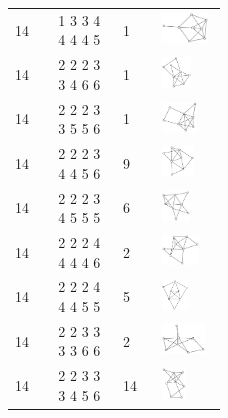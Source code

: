 \begin{footnotesize}
\begin{longtable}{m{0.07\linewidth} m{0.15\linewidth} m{0.05\linewidth} m{0.15\linewidth}}
14 & 1 3 3 4 4 4 4 5 & 1 & \includegraphics[height=0.8cm]{15-universal-graphs/img/degree-sequences-example-graphs/graph-4-8-79}\\
14 & 2 2 2 3 3 4 6 6 & 1 & \includegraphics[height=0.8cm]{15-universal-graphs/img/degree-sequences-example-graphs/graph-4-8-80}\\
14 & 2 2 2 3 3 5 5 6 & 1 & \includegraphics[height=0.8cm]{15-universal-graphs/img/degree-sequences-example-graphs/graph-4-8-81}\\
14 & 2 2 2 3 4 4 5 6 & 9 & \includegraphics[height=0.8cm]{15-universal-graphs/img/degree-sequences-example-graphs/graph-4-8-82}\\
14 & 2 2 2 3 4 5 5 5 & 6 & \includegraphics[height=0.8cm]{15-universal-graphs/img/degree-sequences-example-graphs/graph-4-8-83}\\
14 & 2 2 2 4 4 4 4 6 & 2 & \includegraphics[height=0.8cm]{15-universal-graphs/img/degree-sequences-example-graphs/graph-4-8-84}\\
14 & 2 2 2 4 4 4 5 5 & 5 & \includegraphics[height=0.8cm]{15-universal-graphs/img/degree-sequences-example-graphs/graph-4-8-85}\\
14 & 2 2 3 3 3 3 6 6 & 2 & \includegraphics[height=0.8cm]{15-universal-graphs/img/degree-sequences-example-graphs/graph-4-8-86}\\
14 & 2 2 3 3 3 4 5 6 & 14 & \includegraphics[height=0.8cm]{15-universal-graphs/img/degree-sequences-example-graphs/graph-4-8-87}\\

\end{longtable}
\end{footnotesize}
